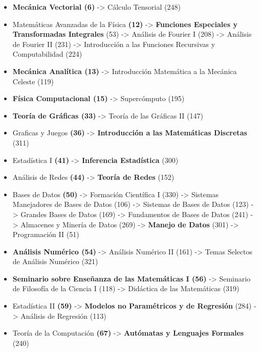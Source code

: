 \begin{appendices}
\begin{itemize}
\item \textbf{Mecánica Vectorial (6)} -> Cálculo Tensorial (248)

  
  \item Matemáticas Avanzadas de la Física \textbf{(12)} -> \textbf{Funciones Especiales y Transformadas Integrales} (53) -> Análisis de Fourier I (208) -> Análisis de Fourier II (231) -> Introducción a las Funciones Recursivas y Computabilidad (224)

  \item \textbf{Mecánica Analítica (13)} -> Introducción Matemática a la Mecánica Celeste (119)

  \item \textbf{Física Computacional (15)} -> Supercómputo (195)

  \item \textbf{Teoría de Gráficas (33)} -> Teoría de las Gráficas II (147)
  
  \item Graficas y Juegos \textbf{(36)} -> \textbf{Introducción a las Matemáticas Discretas} (311)
  
  \item Estadística I \textbf{(41)} -> \textbf{Inferencia Estadística} (300)
  
  \item Análisis de Redes \textbf{(44)} -> \textbf{Teoría de Redes} (152)
  
  \item Bases de Datos \textbf{(50)} -> Formación Científica I (330) -> Sistemas Manejadores de Bases de Datos (106) -> Sistemas de Bases de Datos (123) -> Grandes Bases de Datos (169) -> Fundamentos de Bases de Datos (241) -> Almacenes y Minería de Datos (269) -> \textbf{Manejo de Datos} (301) -> Programación II (51)
  
  \item \textbf{Análisis Numérico (54)} -> Análisis Numérico II (161) -> Temas Selectos de Análisis Numérico (321)
  
  \item \textbf{Seminario sobre Enseñanza de las Matemáticas I (56)} -> Seminario de Filosofía de la Ciencia I (118) -> Didáctica de las Matemáticas (319)
  
  \item Estadística II \textbf{(59)} -> \textbf{Modelos no Paramétricos y de Regresión} (284) -> Análisis de Regresión (113)
  
  \item Teoría de la Computación \textbf{(67)} -> \textbf{Autómatas y Lenguajes Formales} (240)
  

\end{itemize}
\end{appendices}
